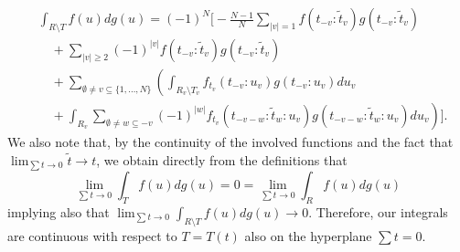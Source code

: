 \documentclass[english, a4paper, 12pt,reqno]{amsart}
\newcommand\myworries[1]{\textcolor{red}{#1}}
\newtheorem{lemma}[defi]{Lemma}
\begin{document}
\begin{equation*}
\begin{split}
&\int_{R \setminus T} f(u) dg(u) = (-1)^N \Bigg[- \frac{N-1}{N} \sum_{|v|=1} f(t_{-v}:\tilde{t}_v)g(t_{-v}:\tilde{t}_v)\\
&\quad + \sum_{|v| \geq 2} (-1)^{|v|} f(t_{-v}:\tilde{t}_v)g(t_{-v}:\tilde{t}_v)\\
&\quad + \sum_{\emptyset\neq v \subseteq \{1,\dots,N\}} \left(\int_{R_v\setminus T_v}  f_{t_v}(t_{-v}:u_v) g(t_{-v}:u_v)du_v \right.\\
&\quad + \left. \int_{R_v} \sum_{\emptyset \neq w \subseteq -v} (-1)^{|w|} f_{t_v}(t_{-v-w}: \tilde{t}_w:u_v) g(t_{-v-w}: \tilde{t}_w:u_v) du_v \right) \Bigg].
\end{split}
\end{equation*}
We also note that, by the continuity of the involved functions and the fact that $\lim_{\sum t \to 0} \tilde{t} \to t$, we obtain directly from the definitions that 
$$\lim_{\sum t \to 0} \int_T f(u) dg(u) = 0 = \lim_{\sum t \to 0} \int_R f(u) dg(u) $$
implying also that $\lim_{\sum t \to 0} \int_{R\setminus T} f(u) dg(u) \to 0$. Therefore, our integrals are continuous with respect to $T = T(t)$ also on the hyperplane $\sum t = 0$.
\end{document}
